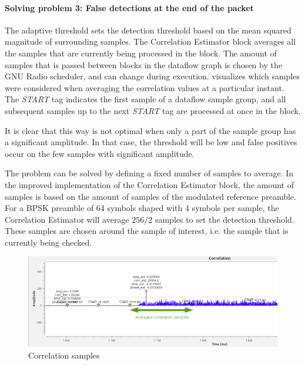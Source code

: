 \paragraph*{Solving problem 3: False detections at the end of the packet}

The adaptive threshold sets the detection threshold based on the mean squared magnitude of surrounding samples. The Correlation Estimator block averages all the samples that are currently being processed in the block. The amount of samples that is passed between blocks in the dataflow graph is chosen by the GNU Radio scheduler, and can change during execution.  %
 visualizes  which samples were considered when averaging the correlation values at a particular instant. The \textit{START} tag indicates the first sample of a dataflow sample group, and all subsequent samples up to the next \textit{START} tag are processed at once in the block.\medskip

It is clear that this way is not optimal when only a part of the sample group has a significant amplitude. In that case, the threshold will be low and false positives occur on the few samples with significant amplitude.\medskip

The problem can be solved by defining a fixed number of samples to average. In the improved implementation of the Correlation Estimator block, the amount of samples is based on the amount of samples of the modulated reference preamble. For a BPSK preamble of 64 symbols shaped with 4 symbols per sample, the Correlation Estimator will average $256/2$ samples to set the detection threshold. These samples are chosen around the sample of interest, i.e. the sample that is currently being checked.\medskip

\begin{figure}[H]
    \centering
    \includegraphics[width=1\textwidth]{img_commchain/corr_dataflow.png}
    \caption{{Correlation samples}}
    \label{fig:corr_dataflow}
\end{figure}

